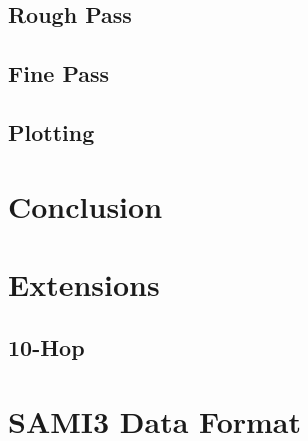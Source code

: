 \documentclass[12pt,letterpaper]{article}
\begin{document}
\subsection{Rough Pass}
\label{sec:design:rough}

\subsection{Fine Pass}
\label{sec:design:fine}

\subsection{Plotting}
\label{sec:design:plotting}

%
%
\section{Conclusion}
\label{sec:conclusion}

%
%
\renewcommand{\bibname}{References}



\begin{appendices}

  \section{Extensions}
  \label{sec:extensions}

  \subsection{10-Hop}
  \label{sec:extensions:10hop}

  \section{SAMI3 Data Format}
  \label{sec:sami3_df}

\end{appendices}
\end{document}
